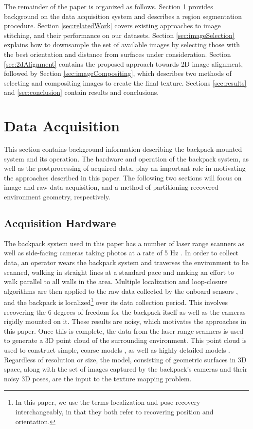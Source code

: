\documentclass[]{spie}  %
\begin{document}
The remainder of the paper is organized as follows. Section
\ref{sec:dataAcquisition} provides background on the data acquisition
system and describes a region segmentation procedure. Section
\ref{sec:relatedWork} covers existing approaches to image stitching,
and their performance on our datasets. Section
\ref{sec:imageSelection} explains how to downsample the set of
available images by selecting those with the best orientation and
distance from surfaces under consideration. Section
\ref{sec:2dAlignment} contains the proposed approach towards 2D image
alignment, followed by Section \ref{sec:imageCompositing}, which
describes two methods of selecting and compositing images to create
the final texture. Sections \ref{sec:results} and \ref{sec:conclusion}
contain results and conclusions.

\section{Data Acquisition}
\label{sec:dataAcquisition}

This section contains background information describing the
backpack-mounted system and its operation. The hardware and operation
of the backpack system, as well as the postprocessing of acquired
data, play an important role in motivating the approaches described in
this paper. The following two sections will focus on image and raw
data acquisition, and a method of partitioning recovered environment
geometry, respectively.

\subsection{Acquisition Hardware}

The backpack system used in this paper has a number of laser range
scanners as well as side-facing cameras taking photos at a rate of 5
Hz \cite{liu2010indoor}. In order to collect data, an operator wears
the backpack system and traverses the environment to be scanned,
walking in straight lines at a standard pace and making an effort to
walk parallel to all walls in the area. Multiple localization and
loop-closure algorithms are then applied to the raw data collected by
the onboard sensors \cite{chen2010indoor, kua2012loopclosure,
  liu2010indoor}, and the backpack is localized\footnote{In this
  paper, we use the terms localization and pose recovery
  interchangeably, in that they both refer to recovering position and
  orientation.}  over its data collection period. This involves
recovering the 6 degrees of freedom for the backpack itself as well as
the cameras rigidly mounted on it. These results are noisy, which
motivates the approaches in this paper. Once this is complete, the
data from the laser range scanners is used to generate a 3D point
cloud of the surrounding environment. This point cloud is used to
construct simple, coarse models \cite{sanchez2012point,
  turnerfloorplan}, as well as highly detailed models
\cite{turnerwatertight}.  Regardless of resolution or size,
the model, consisting of geometric surfaces in 3D space, along with
the set of images captured by the backpack's cameras and their noisy
3D poses, are the input to the texture mapping problem.
\end{document}
